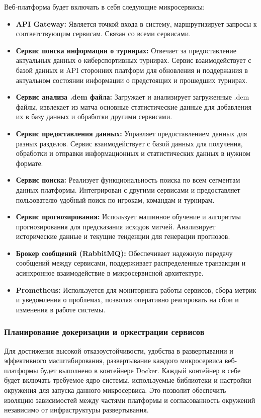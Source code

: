 Веб-платформа будет включать в себя следующие микросервисы:

\begin{itemize}
	\item \textbf{API Gateway:} Является точкой входа в систему, маршрутизирует запросы к соответствующим сервисам. Связан со всеми сервисами.
	\item \textbf{Сервис поиска информации о турнирах:} Отвечает за предоставление актуальных данных о киберспортивных турнирах. Сервис взаимодействует с базой данных и API сторонних платформ для обновления и поддержания в актуальном состоянии информации о предстоящих и прошедших турнирах.
	\item \textbf{Сервис анализа .dem файла:} Загружает и анализирует загруженные .dem файлы, извлекает из матча основные статистические данные для добавления их в базу данных и обработки другими сервисами.
	\item \textbf{Сервис предоставления данных:} Управляет предоставлением данных для разных разделов. Сервис взаимодействует с базой данных для получения, обработки и отправки информационных и статистических данных в нужном формате.
	\item \textbf{Сервис поиска:} Реализует функциональность поиска по всем сегментам данных платформы. Интегрирован с другими сервисами и предоставляет пользователю удобный поиск по игрокам, командам и турнирам.
	\item \textbf{Сервис прогнозирования:} Использует машинное обучение и алгоритмы прогнозирования для предсказания исходов матчей. Анализирует исторические данные и текущие тенденции для генерации прогнозов.
	\item \textbf{Брокер сообщений (RabbitMQ):} Обеспечивает надежную передачу сообщений между сервисами, поддерживает распределенные транзакции и асинхронное взаимодействие в микросервисной архитектуре.
	\item \textbf{Prometheus:} Используется для мониторинга работы сервисов, сбора метрик и уведомления о проблемах, позволяя оперативно реагировать на сбои и изменения в работе системы.
\end{itemize}

\subsubsection{Планирование докеризации и оркестрации сервисов}

Для достижения высокой отказоустойчивости, удобства в развертывании и эффективного масштабирования, развертывание каждого микросервиса веб-платформы будет выполнено в контейнере Docker. Каждый контейнер в себе будет включать требуемое ядро системы, используемые библиотеки и настройки окружения для запуска данного микросервиса. Это позволит обеспечить изоляцию зависимостей между частями платформы и согласованность окружений независимо от инфраструктуры развертывания.

